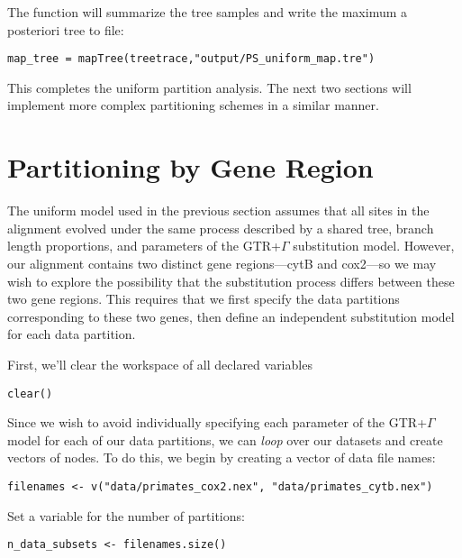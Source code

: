 The  function will summarize the tree samples and write the maximum a posteriori tree to file:
{\tt \begin{snugshade*}
\begin{lstlisting}
map_tree = mapTree(treetrace,"output/PS_uniform_map.tre")
\end{lstlisting}
\end{snugshade*}}

This completes the uniform partition analysis.
The next two sections will implement more complex partitioning schemes in a similar manner.


\section{Partitioning by Gene Region}\label{secByGene}

The uniform model used in the previous section assumes that all sites in the alignment evolved under the same process described by a shared tree, branch length proportions, and parameters of the GTR+$\Gamma$ substitution model.
However, our alignment contains two distinct gene regions---cytB and cox2---so we may wish to explore the possibility that the substitution process differs between these two gene regions.
This requires that we first specify the data partitions corresponding to these two genes, then define an independent substitution model for each data partition. 

First, we'll clear the workspace of all declared variables
{\tt \begin{snugshade*}
\begin{lstlisting}
clear()
\end{lstlisting}
\end{snugshade*}}

Since we wish to avoid individually specifying each parameter of the GTR+$\Gamma$ model for each of our data partitions, we can \textit{loop} over our datasets and create vectors of nodes.
To do this, we begin by creating a vector of data file names:
{\tt \begin{snugshade*}
\begin{lstlisting}
filenames <- v("data/primates_cox2.nex", "data/primates_cytb.nex")
\end{lstlisting}
\end{snugshade*}}

Set a variable for the number of partitions:
{\tt \begin{snugshade*}
\begin{lstlisting}
n_data_subsets <- filenames.size()
\end{lstlisting}
\end{snugshade*}}

